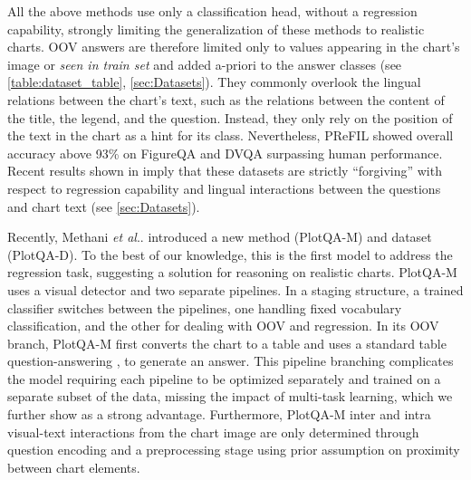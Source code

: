 \documentclass[runningheads]{llncs}
\makeatletter
\DeclareRobustCommand\onedot{\futurelet\@let@token\@onedot}
\def\@onedot{\ifx\@let@token.\else.\null\fi\xspace}
\def\etal{\emph{et al}\onedot}
\makeatother
\begin{document}
All the above methods use only a classification head, without a regression capability, strongly limiting the generalization of these methods to realistic charts. OOV answers are therefore limited only to values appearing in the chart's image or {\it seen in train set} and added a-priori to the answer classes (see \cref{table:dataset_table}, \cref{sec:Datasets}). They commonly overlook the lingual relations between the chart's text, such as the relations between the content of the title, the legend, and the question. Instead, they only rely on the position of the text in the chart as a hint for its class.
Nevertheless, PReFIL showed overall accuracy above 93\% on FigureQA and DVQA surpassing human performance. Recent results shown in \cite{plotqa} imply that these datasets are strictly ``forgiving'' with respect to regression capability and lingual interactions between the questions and chart text (see \cref{sec:Datasets}).

Recently, Methani \etal \cite{plotqa} introduced a new method (PlotQA-M) and dataset (PlotQA-D). To the best of our knowledge, this is the first model to address the regression task, suggesting a solution for reasoning on realistic charts. PlotQA-M uses a visual detector and two separate pipelines. In a staging structure, a trained classifier switches between the pipelines, one handling fixed vocabulary classification, and the other for dealing with OOV and regression. In its OOV branch, PlotQA-M first converts the chart to a table and uses a standard table question-answering \cite{pasupat-liang-2015-compositional}, to generate an answer. This pipeline branching complicates the model requiring each pipeline to be   optimized separately and trained on a separate subset of the data, missing the impact of multi-task learning, which we further show as a strong advantage. Furthermore, PlotQA-M inter and intra visual-text interactions from the chart image are only determined through question encoding and a preprocessing stage using prior assumption on proximity between chart elements.
\end{document}
